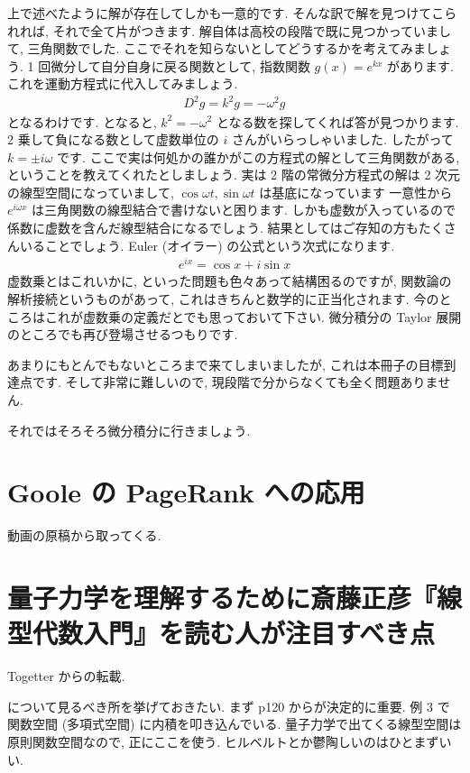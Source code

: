 \documentclass[openany, a4paper, oneside]{jsbook}
\theoremstyle{break}
\theoremstyle{breakdefn}
\begin{document}
上で述べたように解が存在してしかも一意的です. そんな訳で解を見つけてこられれば, それで全て片がつきます.
解自体は高校の段階で既に見つかっていまして, 三角関数でした. ここでそれを知らないとしてどうするかを考えてみましょう.
1 回微分して自分自身に戻る関数として, 指数関数 $g (x)=e^{kx}$ があります. これを運動方程式に代入してみましょう.
    \begin{align}
        D^2 g = k^2 g = - \omega ^{2} g
    \end{align}
となるわけです. となると,  $k^2=-\omega^2$ となる数を探してくれば答が見つかります.
2 乗して負になる数として虚数単位の $i$ さんがいらっしゃいました. したがって $k=\pm i\omega$ です.
ここで実は何処かの誰かがこの方程式の解として三角関数がある, ということを教えてくれたとしましょう.
実は 2 階の常微分方程式の解は 2 次元の線型空間になっていまして,  $\cos \omega t,\sin \omega t$ は基底になっています
一意性から $e^{i\omega x}$ は三角関数の線型結合で書けないと困ります. しかも虚数が入っているので
係数に虚数を含んだ線型結合になるでしょう. 結果としてはご存知の方もたくさんいることでしょう.
Euler (オイラー) の公式という次式になります.
    \begin{align}
        e^{ix} = \cos x + i \sin x
    \end{align}
虚数乗とはこれいかに, といった問題も色々あって結構困るのですが,
関数論の解析接続というものがあって, これはきちんと数学的に正当化されます.
今のところはこれが虚数乗の定義だとでも思っておいて下さい.
微分積分の Taylor 展開のところでも再び登場させるつもりです.

あまりにもとんでもないところまで来てしまいましたが, これは本冊子の目標到達点です.
そして非常に難しいので, 現段階で分からなくても全く問題ありません.

それではそろそろ微分積分に行きましょう.
\chapter{Goole の PageRank への応用}


動画の原稿から取ってくる.
\chapter{量子力学を理解するために斎藤正彦『線型代数入門』\cite{MasahikoSaitoh1}を読む人が注目すべき点}


Togetter からの転載.

\cite{MasahikoSaitoh1} について見るべき所を挙げておきたい.
まず p120 からが決定的に重要.
例 3 で関数空間 (多項式空間) に内積を叩き込んでいる.
量子力学で出てくる線型空間は原則関数空間なので, 正にここを使う.
ヒルベルトとか鬱陶しいのはひとまずいい.
\end{document}
